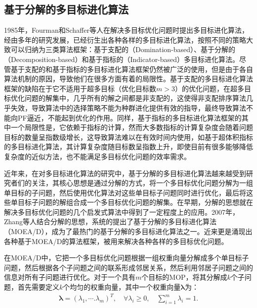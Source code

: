 \subsection{基于分解的多目标进化算法}
\label{subsec:背景介绍:多目标组合优化算法:基于分解的多目标进化算法}
1985年，Fourman和Schaffer等人在解决多目标优化问题时提出多目标进化算法\cite{fourman1985compaction,schaffer1985multiple}，经由多年的研究发展，已经衍生出各种各样的多目标进化算法，按照不同的策略大致可以归纳为三类算法框架：基于支配的（Domination-based）、基于分解的（Decomposition-based）和基于指标的（Indicator-based）多目标进化算法。尽管基于支配的和基于指标的多目标进化算法框架仍然被广泛的使用，但是由于各自算法机制的原因，导致他们在很多方面有着的局限性。基于支配的多目标进化算法框架的缺陷在于它不适用于超多目标（优化目标数$m > 3$）的优化问题，在超多目标优化问题的解集中，几乎所有的解之间都是非支配的，这使得非支配排序算法几乎失效，导致算法中的选择策略不能为种群进化提供有效的指导，最终导致算法不能向PF逼近，不能起到优化的作用\cite{ishibuchi2008behavior,giagkiozis2015methods}。同样，基于指标的多目标进化算法框架的其中一个局限性是，它依赖于指标的计算，然而大多数指标的计算复杂度会随着问题目标的数量呈指数级增长，这导致算法难以在有效时间内使用，如基于超体积指标的多目标进化算法，其计算复杂度随目标数呈指数上升，即使目前有很多能够降低复杂度的近似方法，也不能满足多目标优化问题的效率需求。
\par
近年来，在对多目标进化算法的研究中，基于分解的多目标进化算法越来越受到研究者们的关注，其核心思想是通过分解的方式，将一个多目标优化问题分解为一组单目标的子问题，然后使用优化算法对这些单目标子问题同时进行优化，最后将这些单目标子问题的解组合成一个多目标优化问题的解集。在早期，分解的思想就在解决多目标优化问题的几个启发式算法中得到了一定程度上的应用\cite{ishibuchi1998multi,jin2001adapting,jaszkiewicz2002performance,paquete2003two,hughes2003multiple}。2007年，Zhang等人结合分解的思想，系统的提出了基于分解的多目标进化算法（MOEA/D）\cite{zhang2007moea}，成为了最热门的基于分解的多目标进化算法之一。近来更是涌现出各种基于MOEA/D的算法框架，被用来解决各种各样的多目标优化问题\cite{ke2013moea,ke2014hybridization}。
\par
在MOEA/D中，它把一个多目标优化问题根据一组权重向量分解成多个单目标子问题，然后根据各个子问题之间的联系形成邻居关系，然后利用邻居子问题之间的信息对所有子问题进行优化。对于一个具有$m$个目标的MOP，将其分解成$k$个子问题，首先需要定义$k$个均匀的权重向量，其中一个权重向量$\boldsymbol{\lambda}$为：
\begin{align}
    \label{eq:权重向量}
    \boldsymbol{\lambda} = (\lambda_1, \cdots. \lambda_m)^T, \quad \forall \lambda_i \geq 0 , \quad \sum_{i=1}^m \lambda_i = 1. 
\end{align}
